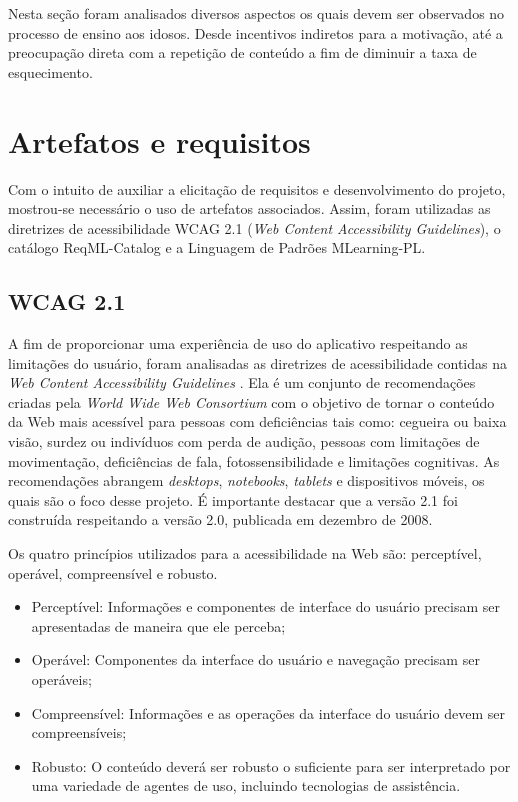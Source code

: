 Nesta seção foram analisados diversos aspectos os quais devem ser observados no processo de ensino aos idosos. Desde incentivos indiretos para a motivação, até a preocupação direta com a repetição de conteúdo a fim de diminuir a taxa de esquecimento. 

\section{Artefatos e requisitos}
\label{subsec:artefatos}
Com o intuito de auxiliar a elicitação de requisitos e desenvolvimento do projeto, mostrou-se necessário o uso de artefatos associados.
Assim, foram utilizadas as diretrizes de acessibilidade WCAG 2.1 (\textit{Web Content Accessibility Guidelines}), o catálogo ReqML-Catalog e a Linguagem de Padrões MLearning-PL.

\subsection{WCAG 2.1}
A fim de proporcionar uma experiência de uso do aplicativo respeitando as limitações do usuário, foram analisadas as diretrizes de acessibilidade contidas na \textit{Web Content Accessibility Guidelines} \citep{wcag}. Ela é um conjunto de recomendações criadas pela
\textit{World Wide Web Consortium} \citep{w3c} com o objetivo de tornar o conteúdo da Web mais acessível para pessoas com deficiências tais como: cegueira ou baixa visão, surdez ou indivíduos com perda de audição, pessoas com limitações de movimentação, deficiências de fala, fotossensibilidade e limitações cognitivas. As recomendações abrangem \textit{desktops}, \textit{notebooks}, \textit{tablets} e dispositivos móveis, os quais são o foco desse projeto. É importante destacar que a versão 2.1 foi construída respeitando a versão 2.0, publicada em dezembro de 2008. %

Os quatro princípios utilizados para a acessibilidade na Web são: perceptível, operável, compreensível e robusto.
\begin{itemize}
    \item Perceptível: Informações e componentes de interface do usuário precisam ser apresentadas de maneira que ele perceba;
    \item Operável: Componentes da interface do usuário e navegação precisam ser operáveis;
    \item Compreensível: Informações e as operações da interface do usuário devem ser compreensíveis;
    \item Robusto: O conteúdo deverá ser robusto o suficiente para ser interpretado por uma variedade de agentes de uso, incluindo tecnologias de assistência.
\end{itemize}

